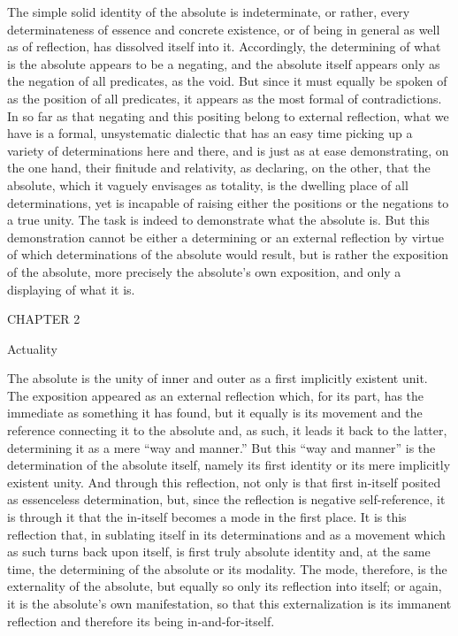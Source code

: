 The simple solid identity of the absolute is indeterminate, or rather,
every determinateness of essence and concrete existence,
or of being in general as well as of reflection,
has dissolved itself into it.
Accordingly, the determining of what is
the absolute appears to be a negating,
and the absolute itself appears only as
the negation of all predicates, as the void.
But since it must equally be spoken of
as the position of all predicates,
it appears as the most formal of contradictions.
In so far as that negating and this positing
belong to external reflection,
what we have is a formal, unsystematic dialectic
that has an easy time picking up
a variety of determinations here and there,
and is just as at ease demonstrating, on the one hand,
their finitude and relativity, as declaring, on the other,
that the absolute, which it vaguely envisages as totality,
is the dwelling place of all determinations,
yet is incapable of raising either
the positions or the negations to a true unity.
The task is indeed to demonstrate what the absolute is.
But this demonstration cannot be either
a determining or an external reflection
by virtue of which determinations
of the absolute would result,
but is rather the exposition of the absolute,
more precisely the absolute's own exposition,
and only a displaying of what it is.

CHAPTER 2

Actuality

The absolute is the unity of inner and outer
as a first implicitly existent unit.
The exposition appeared as an external reflection
which, for its part, has the immediate
as something it has found,
but it equally is its movement
and the reference connecting it to the absolute
and, as such, it leads it back to the latter,
determining it as a mere “way and manner.”
But this “way and manner” is the
determination of the absolute itself,
namely its first identity
or its mere implicitly existent unity.
And through this reflection, not only is
that first in-itself posited as essenceless determination,
but, since the reflection is negative self-reference,
it is through it that the in-itself becomes
a mode in the first place.
It is this reflection that,
in sublating itself in its determinations
and as a movement which as such turns back upon itself,
is first truly absolute identity
and, at the same time, the determining of
the absolute or its modality.
The mode, therefore, is the externality of the absolute,
but equally so only its reflection into itself;
or again, it is the absolute's own manifestation,
so that this externalization is its immanent reflection
and therefore its being in-and-for-itself.

